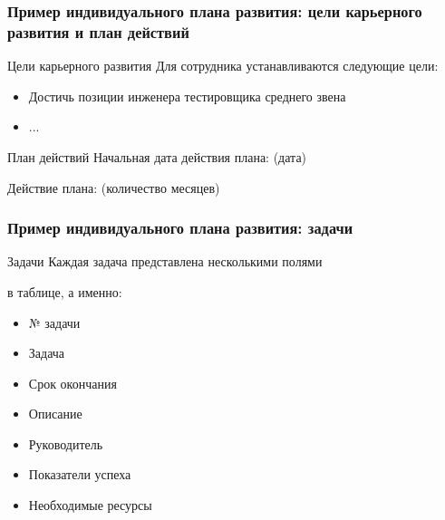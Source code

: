 \documentclass{../industrial-development}
\begin{document}
\begin{frame} \frametitle{Пример индивидуального плана развития: цели карьерного развития и план действий }
 \begin{block}{ Цели карьерного развития}
Для сотрудника устанавливаются следующие цели:
\begin{itemize}
  \item Достичь позиции инженера тестировщика среднего звена
  \item ...
  \end{itemize}
\end{block}
 \begin{block}{ План действий}
Начальная дата действия плана: (дата)

Действие плана: (количество месяцев)
\end{block}
\end{frame}

\begin{frame} \frametitle{Пример индивидуального плана развития: задачи }

 \begin{block}{ Задачи}
Каждая задача представлена несколькими полями 

в таблице, а именно:
\begin{itemize}
  \item № задачи
  \item Задача
  \item Срок окончания
  \item Описание
  \item Руководитель
  \item Показатели успеха
  \item Необходимые ресурсы
  \end{itemize}
\end{block}


\end{frame}
\end{document}
